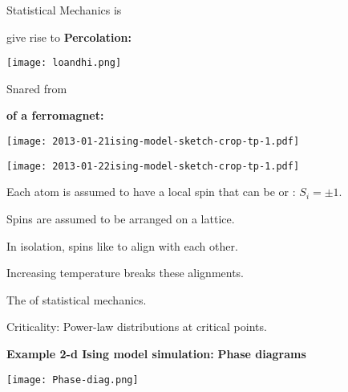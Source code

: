      
      Statistical Mechanics is 
    
       give rise to 
  \textbf{Percolation:}
    
\begin{marginfigure}[]
\texttt{[image: loandhi.png]}
\end{marginfigure}

    
    Snared from 
  \small

    \textbf{\normalsize {} of a ferromagnet:}
      \small
        
        
\begin{marginfigure}[]
\texttt{[image: 2013-01-21ising-model-sketch-crop-tp-1.pdf]}\\
\end{marginfigure}

        
\begin{marginfigure}[]
\texttt{[image: 2013-01-22ising-model-sketch-crop-tp-1.pdf]}
\end{marginfigure}

         
          Each atom is assumed to have a local spin 
          that can be  or : $ S_i = \pm 1$.
         
          Spins are assumed to be arranged on a lattice.
         
          In isolation, spins like to align with each other.
         
          Increasing temperature breaks these alignments.
         
          The  of statistical mechanics.
         
          Criticality: Power-law distributions at critical points.
      
    
    \textbf{Example 2-d Ising model simulation:}
      \small
  \textbf{Phase diagrams}

  
\begin{marginfigure}[]
\texttt{[image: Phase-diag.png]}
\end{marginfigure}


